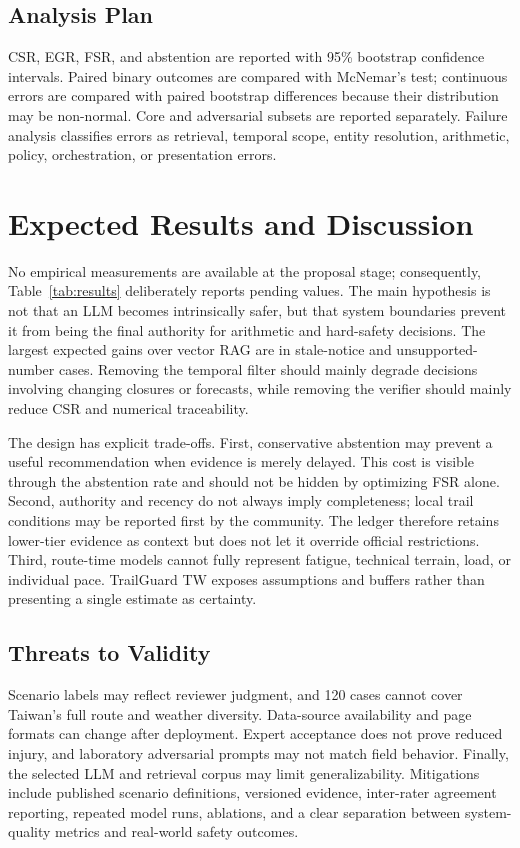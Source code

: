 \documentclass[conference]{IEEEtran}
\begin{document}
\subsection{Analysis Plan}
CSR, EGR, FSR, and abstention are reported with 95\% bootstrap confidence
intervals. Paired binary outcomes are compared with McNemar's test; continuous
errors are compared with paired bootstrap differences because their
distribution may be non-normal. Core and adversarial subsets are reported
separately. Failure analysis classifies errors as retrieval, temporal scope,
entity resolution, arithmetic, policy, orchestration, or presentation errors.

\section{Expected Results and Discussion}
\label{sec:results}
No empirical measurements are available at the proposal stage; consequently,
Table~\ref{tab:results} deliberately reports pending values. The main
hypothesis is not that an LLM becomes intrinsically safer, but that system
boundaries prevent it from being the final authority for arithmetic and
hard-safety decisions. The largest expected gains over vector RAG are in
stale-notice and unsupported-number cases. Removing the temporal filter should
mainly degrade decisions involving changing closures or forecasts, while
removing the verifier should mainly reduce CSR and numerical traceability.

The design has explicit trade-offs. First, conservative abstention may prevent
a useful recommendation when evidence is merely delayed. This cost is visible
through the abstention rate and should not be hidden by optimizing FSR alone.
Second, authority and recency do not always imply completeness; local trail
conditions may be reported first by the community. The ledger therefore
retains lower-tier evidence as context but does not let it override official
restrictions. Third, route-time models cannot fully represent fatigue,
technical terrain, load, or individual pace. TrailGuard TW exposes assumptions
and buffers rather than presenting a single estimate as certainty.

\subsection{Threats to Validity}
Scenario labels may reflect reviewer judgment, and 120 cases cannot cover
Taiwan's full route and weather diversity. Data-source availability and page
formats can change after deployment. Expert acceptance does not prove reduced
injury, and laboratory adversarial prompts may not match field behavior.
Finally, the selected LLM and retrieval corpus may limit generalizability.
Mitigations include published scenario definitions, versioned evidence,
inter-rater agreement reporting, repeated model runs, ablations, and a clear
separation between system-quality metrics and real-world safety outcomes.
\end{document}
